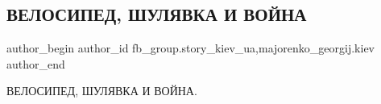  
 
 
 
 
 
\subsection{ВЕЛОСИПЕД, ШУЛЯВКА И ВОЙНА}
\label{sec:30_07_2021.fb.fb_group.story_kiev_ua.1.velosiped_shuljavka_i_vojna}
 
\ifcmt
 author_begin
   author_id fb_group.story_kiev_ua,majorenko_georgij.kiev
 author_end
\fi

ВЕЛОСИПЕД, ШУЛЯВКА И ВОЙНА.

